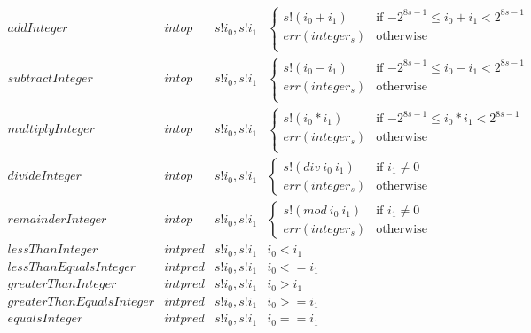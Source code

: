 \documentclass[../main.tex]{subfiles}
\begin{document}
\begin{figure*}[t]
\[\begin{array}{lllll}
        addInteger        &  intop  &  s!i_0 , s!i_1   & \begin{cases}
          s!(i_0 + i_1)                     & \text{if $-2^{8s-1} \leq i_0 + i_1 < 2^{8s-1}$}\\
          err(integer_s)  & \text{otherwise}\\
        \end{cases} \\
        subtractInteger   &  intop  &  s!i_0 , s!i_1 & \begin{cases}
          s!(i_0 - i_1)                     & \text{if $-2^{8s-1} \leq i_0 - i_1 < 2^{8s-1}$}\\
          err(integer_s)  & \text{otherwise}\\
        \end{cases} \\
        multiplyInteger   &  intop  &  s!i_0 , s!i_1   & \begin{cases}
          s!(i_0 * i_1)                     & \text{if $-2^{8s-1} \leq i_0 * i_1 < 2^{8s-1}$}\\
          err(integer_s)  & \text{otherwise}\\
        \end{cases} \\
        divideInteger     &  intop  &  s!i_0 , s!i_1   & \begin{cases}
          s!(div ~ i_0 ~ i_1)                     & \text{if $i_1 \not= 0$}\\
          err(integer_s)  & \text{otherwise}
        \end{cases}\\
        remainderInteger  &  intop  &  s!i_0 , s!i_1   & \begin{cases}
          s!(mod ~ i_0 ~ i_1)                     & \text{if $i_1 \not= 0$}\\
          err(integer_s)  & \text{otherwise}
        \end{cases}\\
        
        lessThanInteger            &  intpred  &  s!i_0 , s!i_1   &   i_0 < i_1\\
        lessThanEqualsInteger      &  intpred  &  s!i_0 , s!i_1   &   i_0 <= i_1\\
        greaterThanInteger         &  intpred  &  s!i_0 , s!i_1   &   i_0 > i_1\\
        greaterThanEqualsInteger   &  intpred  &  s!i_0 , s!i_1   &   i_0 >= i_1\\
        equalsInteger              &  intpred  &  s!i_0 , s!i_1   &   i_0 == i_1\\
        

\end{array}\]
\end{figure*}
\end{document}
